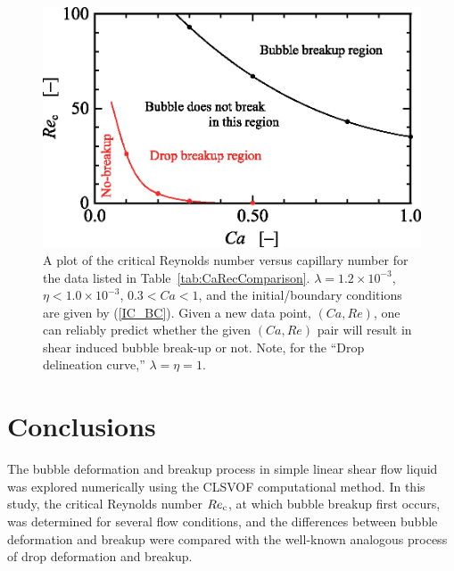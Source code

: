 \documentclass{elsarticle}
\begin{document}
\begin{figure}%
  \centering
  \includegraphics[scale=0.6]{Figure/12-CaRecFit}
  \caption{A plot of the critical Reynolds number versus capillary number
	for the data listed in Table~\ref{tab:CaRecComparison}.  
	$\lambda = 1.2 \times 10^{-3}$, 
	$\eta < 1.0 \times 10^{-3}$, $0.3<Ca<1$, and
        the initial/boundary conditions are given by (\ref{IC_BC}).
	Given a new data point, $(Ca,Re)$, one
	can reliably predict whether the 
	given $(Ca,Re)$ pair will result in shear
	induced bubble break-up or not.  Note, for the ``Drop delineation
	curve,'' $\lambda=\eta=1$.
	   }
  \label{fig:CaRecFit}
\end{figure}
%

\section{Conclusions}
The bubble deformation and breakup process in simple linear shear flow liquid
was explored numerically using the CLSVOF computational method.  In this study,
the critical Reynolds number $Re_{\rm c}$, at which bubble breakup first occurs,
was determined for several flow conditions, and the differences between bubble
deformation and breakup were compared with the well-known analogous process of
drop deformation and breakup.
\end{document}
